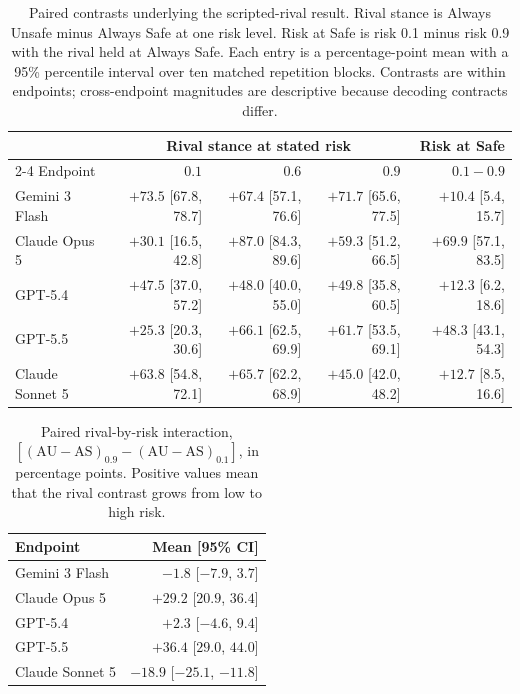 \documentclass{article}
\begin{document}
\begin{table}[t]
    \caption{Paired contrasts underlying the scripted-rival result. Rival
    stance is Always Unsafe minus Always Safe at one risk level. Risk at Safe
    is risk 0.1 minus risk 0.9 with the rival held at Always Safe. Each entry is
    a percentage-point mean with a 95\% percentile interval over ten matched
    repetition blocks. Contrasts are within endpoints; cross-endpoint magnitudes
    are descriptive because decoding contracts differ.}
    \label{tab:scripted-opponent-contrasts}
    \centering
    \footnotesize
    \setlength{\tabcolsep}{4.5pt}
    \begin{tabular}{@{}lrrrr@{}}
        \toprule
        & \multicolumn{3}{c}{Rival stance at stated risk} & Risk at Safe \\
        \cmidrule(lr){2-4}
        Endpoint & $0.1$ & $0.6$ & $0.9$ & $0.1-0.9$ \\
        \midrule
        Gemini 3 Flash  & $+73.5$ [67.8, 78.7] & $+67.4$ [57.1, 76.6] & $+71.7$ [65.6, 77.5] & $+10.4$ [5.4, 15.7] \\
        Claude Opus 5   & $+30.1$ [16.5, 42.8] & $+87.0$ [84.3, 89.6] & $+59.3$ [51.2, 66.5] & $+69.9$ [57.1, 83.5] \\
        GPT-5.4         & $+47.5$ [37.0, 57.2] & $+48.0$ [40.0, 55.0] & $+49.8$ [35.8, 60.5] & $+12.3$ [6.2, 18.6] \\
        GPT-5.5         & $+25.3$ [20.3, 30.6] & $+66.1$ [62.5, 69.9] & $+61.7$ [53.5, 69.1] & $+48.3$ [43.1, 54.3] \\
        Claude Sonnet 5 & $+63.8$ [54.8, 72.1] & $+65.7$ [62.2, 68.9] & $+45.0$ [42.0, 48.2] & $+12.7$ [8.5, 16.6] \\
        \bottomrule
    \end{tabular}
\end{table}

\begin{table}[t]
    \caption{Paired rival-by-risk interaction,
    $[(\mathrm{AU}-\mathrm{AS})_{0.9}-(\mathrm{AU}-\mathrm{AS})_{0.1}]$, in
    percentage points. Positive values mean that the rival contrast grows from
    low to high risk.}
    \label{tab:scripted-opponent-interaction}
    \centering
    \footnotesize
    \begin{tabular}{@{}lr@{}}
        \toprule
        Endpoint & Mean [95\% CI] \\
        \midrule
        Gemini 3 Flash  & $-1.8$ [$-7.9$, $3.7$] \\
        Claude Opus 5   & $+29.2$ [$20.9$, $36.4$] \\
        GPT-5.4         & $+2.3$ [$-4.6$, $9.4$] \\
        GPT-5.5         & $+36.4$ [$29.0$, $44.0$] \\
        Claude Sonnet 5 & $-18.9$ [$-25.1$, $-11.8$] \\
        \bottomrule
    \end{tabular}
\end{table}
\end{document}
